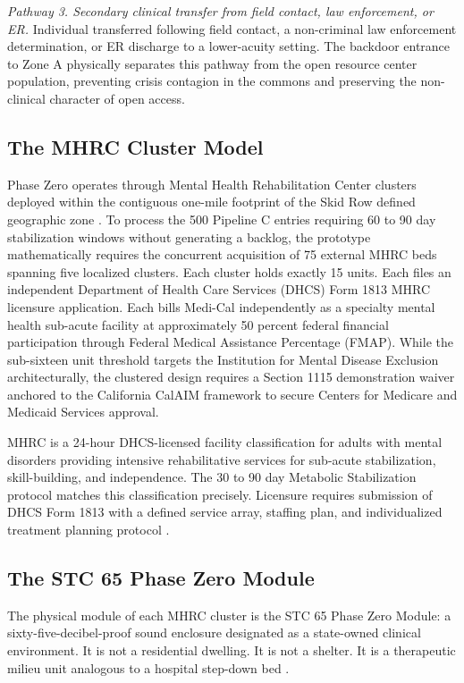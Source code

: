 \documentclass[12pt, letterpaper]{article}
\begin{document}
\textit{Pathway 3. Secondary clinical transfer from field contact, law enforcement, or ER.} Individual transferred following field contact, a non-criminal law enforcement determination, or ER discharge to a lower-acuity setting. The backdoor entrance to Zone A physically separates this pathway from the open resource center population, preventing crisis contagion in the commons and preserving the non-clinical character of open access.

\subsection{The MHRC Cluster Model}

Phase Zero operates through Mental Health Rehabilitation Center clusters deployed within the contiguous one-mile footprint of the Skid Row defined geographic zone \citep{dhcs_mhrc_2024}. To process the 500 Pipeline C entries requiring 60 to 90 day stabilization windows without generating a backlog, the prototype mathematically requires the concurrent acquisition of 75 external MHRC beds spanning five localized clusters. Each cluster holds exactly 15 units. Each files an independent Department of Health Care Services (DHCS) Form 1813 MHRC licensure application. Each bills Medi-Cal independently as a specialty mental health sub-acute facility at approximately 50 percent federal financial participation through Federal Medical Assistance Percentage (FMAP). While the sub-sixteen unit threshold targets the Institution for Mental Disease Exclusion architecturally, the clustered design requires a Section 1115 demonstration waiver anchored to the California CalAIM framework to secure Centers for Medicare and Medicaid Services approval.

MHRC is a 24-hour DHCS-licensed facility classification for adults with mental disorders providing intensive rehabilitative services for sub-acute stabilization, skill-building, and independence. The 30 to 90 day Metabolic Stabilization protocol matches this classification precisely. Licensure requires submission of DHCS Form 1813 with a defined service array, staffing plan, and individualized treatment planning protocol \citep{dhcs_mhrc_2024, medi_cal_act_2024}.

\subsection{The STC 65 Phase Zero Module}

The physical module of each MHRC cluster is the STC 65 Phase Zero Module: a sixty-five-decibel-proof sound enclosure designated as a state-owned clinical environment. It is not a residential dwelling. It is not a shelter. It is a therapeutic milieu unit analogous to a hospital step-down bed \citep{frontiers_acoustic_2024, gb_acoustics_2024}.
\end{document}
